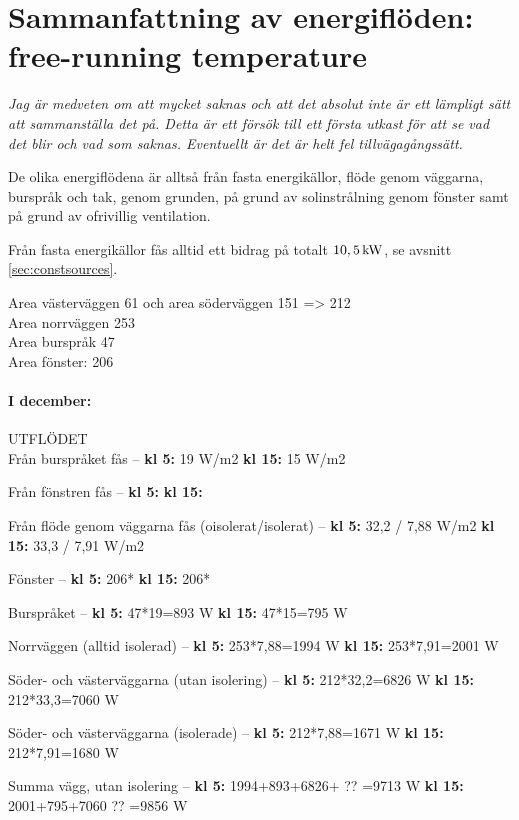 \section{Sammanfattning av energiflöden: free-running temperature}

\emph{\color{red} Jag är medveten om att mycket saknas och att det absolut inte är ett lämpligt sätt att sammanställa det på. Detta är ett försök till ett första utkast för att se vad det blir och vad som saknas. Eventuellt är det är helt fel tillvägagångssätt.}

De olika energiflödena är alltså från fasta energikällor, flöde genom väggarna, burspråk och tak, genom grunden, på grund av solinstrålning genom fönster samt på grund av ofrivillig ventilation.

Från fasta energikällor fås alltid ett bidrag på totalt $\unit[10,5]{kW}$, se avsnitt \ref{sec:constsources}.

Area västerväggen 61 och area söderväggen 151 => 212\\
Area norrväggen 253\\
Area burspråk 47\\
Area fönster: 206 

\paragraph{I december:}
UTFLÖDET\\

Från burspråket fås –
\textbf{kl 5:} 19 W/m2
\textbf{kl 15:} 15 W/m2

Från fönstren fås –
\textbf{kl 5:} 
\textbf{kl 15:} 

Från flöde genom väggarna fås (oisolerat/isolerat) –
\textbf{\textbf{kl 5:}} 32,2 / 7,88 W/m2
\textbf{kl 15:} 33,3 / 7,91 W/m2

Fönster –
\textbf{kl 5:} 206*
\textbf{kl 15:} 206*

Burspråket – 
\textbf{kl 5:} 47*19=893 W
\textbf{kl 15:} 47*15=795 W

Norrväggen (alltid isolerad) –
\textbf{kl 5:} 253*7,88=1994 W
\textbf{kl 15:} 253*7,91=2001 W

Söder- och västerväggarna (utan isolering) –
\textbf{kl 5:} 212*32,2=6826 W
\textbf{kl 15:} 212*33,3=7060 W

Söder- och västerväggarna (isolerade) –
\textbf{kl 5:} 212*7,88=1671 W
\textbf{kl 15:} 212*7,91=1680 W

Summa vägg, utan isolering –
\textbf{kl 5:} 1994+893+6826+ ?? =9713 W
\textbf{kl 15:} 2001+795+7060 ?? =9856 W

